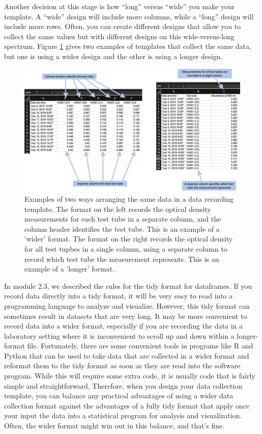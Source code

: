 \documentclass[]{tufte-book}
\begin{document}
Another decision at this stage is how ``long'' versus ``wide'' you make your
template. A ``wide'' design will include more columns, while a ``long'' design will
include more rows. Often, you can create different designs that allow you to
collect the same values but with different designs on this wide-versus-long
spectrum. Figure \ref{fig:longversuswide} gives two examples of templates that
collect the same data, but one is using a wider design and the other is using a
longer design.

\begin{figure}
\includegraphics[width=\textwidth]{figures/growth_curve_long_vs_wide} \caption[Examples of two ways arranging the same data in a data recording template]{Examples of two ways arranging the same data in a data recording template. The format on the left records the optical density measurements for each test tube in a separate column, and the column header identifies the test tube. This is an example of a 'wider' format. The format on the right records the optical density for all test tupbes in a single column, using a separate column to record which test tube the measurement represents. This is an example of a 'longer' format.}\label{fig:longversuswide}
\end{figure}

In module 2.3, we described the rules for the tidy format for dataframes.
If you record data directly into a tidy format, it will be very easy to
read into a programming language to analyze and visualize. However,
this tidy format can sometimes result in datasets that are very long. It
may be more convenient to record data into a wider format, especially if you
are recording the data in a laboratory setting where it is inconvenient to
scroll up and down within a longer-format file. Fortunately, there are some
convenient tools in programs like R and Python that can be used to take
data that are collected in a wider format and reformat them to the tidy
format as soon as they are read into the software program. While this will
require some extra code, it is usually code that is fairly simple and straightforward.
Therefore, when you design your data collection template, you can balance
any practical advantages of using a wider data collection format against
the advantages of a fully tidy format that apply once your input the data
into a statistical program for analysis and visualization. Often, the wider
format might win out in this balance, and that's fine.
\end{document}
